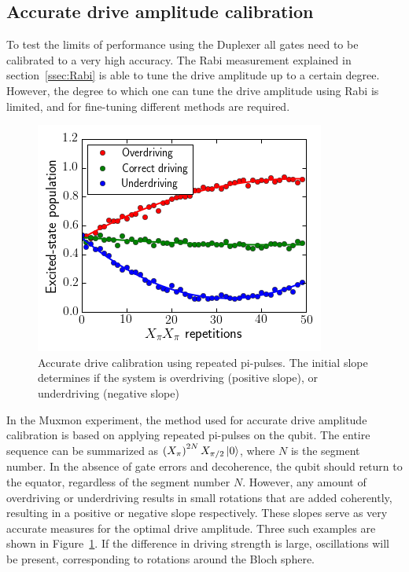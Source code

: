       \subsection{Accurate drive amplitude calibration}
        \label{ssec:PiX360}
        To test the limits of performance using the Duplexer all gates need to be calibrated to a very high accuracy. The Rabi measurement explained in section~\ref{ssec:Rabi} is able to tune the drive amplitude up to a certain degree. However, the degree to which one can tune the drive amplitude using Rabi is limited, and for fine-tuning different methods are required.

        \begin{figure}[tb]
          \centering
          \includegraphics[width=.6\linewidth]{../Figures/Calibration routines/Drive calibration.png}
          \caption{Accurate drive calibration using repeated pi-pulses. The initial slope determines if the system is overdriving (positive slope), or underdriving (negative slope)}
          \label{fig:PiX360}
        \end{figure}

        In the Muxmon experiment, the method used for accurate drive amplitude calibration is based on applying repeated pi-pulses on the qubit. The entire sequence can be summarized as $\left( X_{\pi} \right)^{2N} X_{\pi/2} \ket{0}$, where $N$ is the segment number. In the absence of gate errors and decoherence, the qubit should return to the equator, regardless of the segment number $N$. However, any amount of overdriving or underdriving results in small rotations that are added coherently, resulting in a positive or negative slope respectively. These slopes serve as very accurate measures for the optimal drive amplitude. Three such examples are shown in Figure~\ref{fig:PiX360}. If the difference in driving strength is large, oscillations will be present, corresponding to rotations around the Bloch sphere.


